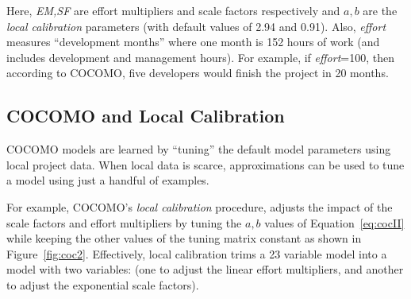 \documentclass[smallcondesed]{svjour3}
\newcommand{\fig}[1]{Figure~\ref{fig:#1}}
\begin{document}
Here, {\em EM,SF} are  effort multipliers and scale
factors respectively and
 $a,b$ are the {\em local calibration} parameters (with default values of 2.94 and 0.91).
Also, {\em effort}
measures ``development months'' where one month
is 152 hours of work  (and includes development and management hours).
For example, if {\em effort}=100, then according to COCOMO,
five developers would finish
the project in 20 months.







 
\subsection{COCOMO and Local Calibration}\label{sect:coconut}
COCOMO models are learned by ``tuning''
  the default model parameters using local
  project data.
When local data is scarce, approximations can be used to
tune a model using just a handful of examples.  

For example,
 COCOMO's   {\em local calibration} procedure, adjusts the impact of the scale factors and effort
multipliers by tuning the  $a,b$ values of Equation~\ref{eq:cocII}
while keeping the other values of the tuning matrix constant as
shown in \fig{coc2}. Effectively, local calibration trims
a 23 variable model
into a model with two variables: (one  to adjust the linear effort
multipliers, and another to adjust the exponential scale factors).
\end{document}
